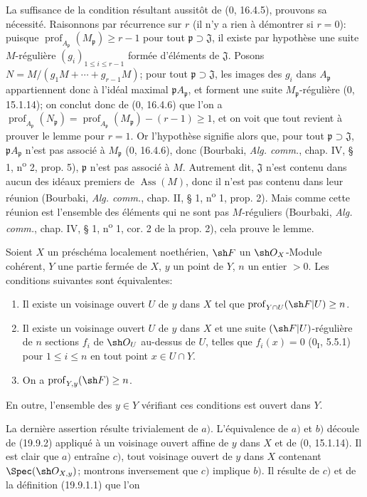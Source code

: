 La suffisance de la condition résultant aussitôt de ($0$, 16.4.5), prouvons sa nécessité. Raisonnons par récurrence sur $r$ (il n'y a rien à démontrer si $r=0$): puisque $\operatorname{prof}_{A_{\mathfrak p}}(M_{\mathfrak p})\geq r-1$ pour tout $\mathfrak p\supset\mathfrak J$, il existe par hypothèse une suite $M$-régulière $(g_i)_{1\leq i\leq r-1}$ formée d'éléments de $\mathfrak J$. Posons $N=M/(g_1M+\cdots+g_{r-1}M)$; pour tout $\mathfrak p\supset\mathfrak J$, les images des $g_i$ dans $A_{\mathfrak p}$ appartiennent donc à l'idéal maximal $\mathfrak pA_{\mathfrak p}$, et forment une suite $M_{\mathfrak p}$-régulière ($0$, 15.1.14); on conclut donc de ($0$, 16.4.6) que l'on a $\operatorname{prof}_{A_{\mathfrak p}}(N_{\mathfrak p})=\operatorname{prof}_{A_{\mathfrak p}}(M_{\mathfrak p})-(r-1)\geq1$, et on voit que tout revient à prouver le lemme pour $r=1$. Or l'hypothèse signifie alors que, pour tout $\mathfrak p\supset\mathfrak J$, $\mathfrak pA_{\mathfrak p}$ n'est pas associé à $M_{\mathfrak p}$ ($0$, 16.4.6), donc (Bourbaki, \emph{Alg. comm.}, chap. IV, § 1, n\textsuperscript{o} 2, prop. 5), $\mathfrak p$ n'est pas associé à $M$. Autrement dit, $\mathfrak J$ n'est contenu dans aucun des idéaux premiers de $\operatorname{Ass}(M)$, donc il n'est pas contenu dans leur réunion (Bourbaki, \emph{Alg. comm.}, chap. II, § 1, n\textsuperscript{o} 1, prop. 2). Mais comme cette réunion est l'ensemble des éléments qui ne sont pas $M$-réguliers (Bourbaki, \emph{Alg. comm.}, chap. IV, § 1, n\textsuperscript{o} 1, cor. 2 de la prop. 2), cela prouve le lemme.

\begin{proposition}[19.9.3]
\label{IV.19.9.3}
Soient $X$ un préschéma localement noethérien, $\sh F$ un $\sh O_X$-Module cohérent, $Y$ une partie fermée de $X$, $y$ un point de $Y$, $n$ un entier $>0$. Les conditions suivantes sont équivalentes:
\begin{enumerate}
  \item[a)] Il existe un voisinage ouvert $U$ de $y$ dans $X$ tel que $\operatorname{prof}_{Y\cap U}(\sh F|U)\geq n$.
  \item[b)] Il existe un voisinage ouvert $U$ de $y$ dans $X$ et une suite $(\sh F|U)$-régulière de $n$ sections $f_i$ de $\sh O_U$ au-dessus de $U$, telles que $f_i(x)=0$ ($0_{\mathrm I}$, 5.5.1) pour $1\leq i\leq n$ en tout point $x\in U\cap Y$.
  \item[c)] On a $\operatorname{prof}_{Y,y}(\sh F)\geq n$.
\end{enumerate}
En outre, l'ensemble des $y\in Y$ vérifiant ces conditions est ouvert dans $Y$.
\end{proposition}

La dernière assertion résulte trivialement de $a)$. L'équivalence de $a)$ et $b)$ découle de (19.9.2) appliqué à un voisinage ouvert affine de $y$ dans $X$ et de ($0$, 15.1.14). Il est clair que $a)$ entraîne $c)$, tout voisinage ouvert de $y$ dans $X$ contenant $\Spec(\sh O_{X,y})$; montrons inversement que $c)$ implique $b)$. Il résulte de $c)$ et de la définition (19.9.1.1) que l'on

